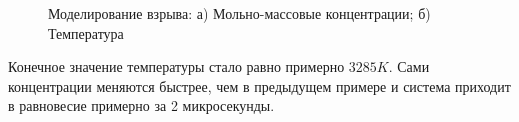\begin{figure}
    \begin{subfigure}[t]{0.45\linewidth}
        \centering
        
        \caption{}
    \end{subfigure}
    \hfill
    \begin{subfigure}[t]{0.45\linewidth}
        \centering
        
        \caption{}
    \end{subfigure}
    \hfill
    \caption{Моделирование взрыва: а) Мольно-массовые концентрации; б) Температура}
    \label{fig:bomb}
\end{figure}

Конечное значение температуры стало равно примерно $3285K$. Сами концентрации меняются быстрее, чем в предыдущем примере и система
приходит в равновесие примерно за 2 микросекунды.